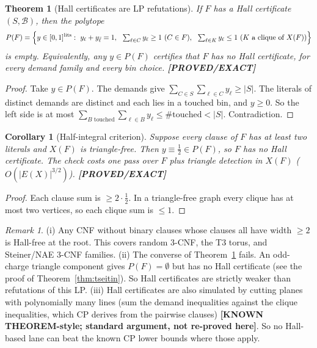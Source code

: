 \documentclass[11pt]{article}
\newtheorem{theorem}{Theorem}
\newtheorem{corollary}{Corollary}
\theoremstyle{definition}
\theoremstyle{remark}
\newtheorem{remark}{Remark}
\newcommand{\lab}[1]{\textbf{[#1]}}
\begin{document}
\begin{theorem}[Hall certificates are LP refutations]\label{thm:lp}
If $F$ has a Hall certificate $(S,\mathcal B)$, then the polytope
\[
P(F)=\Bigl\{y\in[0,1]^{\mathrm{lits}}:\ y_\ell+y_{\bar\ell}=1,\ \ \textstyle\sum_{\ell\in C}y_\ell\ge1\ (C\in F),
\ \ \sum_{\ell\in K}y_\ell\le1\ (K \text{ a clique of } X(F))\Bigr\}
\]
is empty. Equivalently, any $y\in P(F)$ certifies that $F$ has no Hall certificate, for every
demand family and every bin choice. \lab{PROVED/EXACT}
\end{theorem}
\begin{proof}
Take $y\in P(F)$. The demands give $\sum_{C\in S}\sum_{\ell\in C}y_\ell\ge|S|$. The literals of
distinct demands are distinct and each lies in a touched bin, and $y\ge0$. So the left side is
at most $\sum_{B\text{ touched}}\sum_{\ell\in B}y_\ell\le\#\text{touched}<|S|$. Contradiction.
\end{proof}

\begin{corollary}[Half-integral criterion]\label{cor:half}
Suppose every clause of $F$ has at least two literals and $X(F)$ is triangle-free. Then
$y\equiv\tfrac12\in P(F)$, so $F$ has no Hall certificate. The check costs one pass over $F$
plus triangle detection in $X(F)$ ($O(|E(X)|^{3/2})$). \lab{PROVED/EXACT}
\end{corollary}
\begin{proof}
Each clause sum is $\ge 2\cdot\tfrac12$. In a triangle-free graph every clique has at most two
vertices, so each clique sum is $\le1$.
\end{proof}

\begin{remark}
(i) Any CNF without binary clauses whose clauses all have width $\ge2$ is Hall-free at the root.
This covers random 3-CNF, the T3 torus, and Steiner/NAE 3-CNF families.
(ii) The converse of Theorem~\ref{thm:lp} fails. An odd-charge triangle component gives
$P(F)=\emptyset$ but has no Hall certificate (see the proof of Theorem~\ref{thm:tseitin}). So
Hall certificates are strictly weaker than refutations of this LP.
(iii) Hall certificates are also simulated by cutting planes with polynomially many lines (sum
the demand inequalities against the clique inequalities, which CP derives from the pairwise
clauses) \lab{KNOWN THEOREM-style; standard argument, not re-proved here}. So no Hall-based lane can beat the known CP lower
bounds where those apply.
\end{remark}
\end{document}
